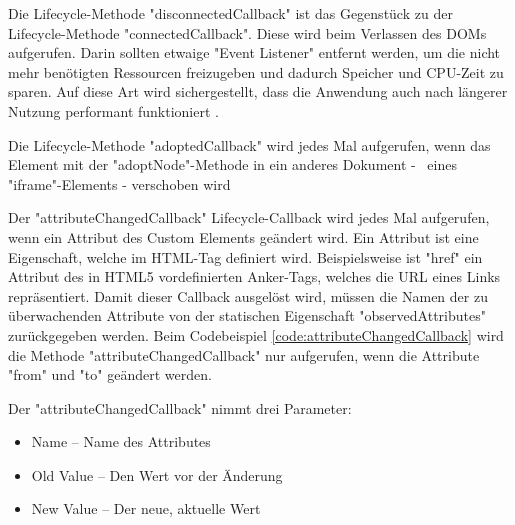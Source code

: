 
Die Lifecycle-Methode "{\ttfamily disconnectedCallback}" ist das Gegenstück zu der Lifecycle-Methode "{\ttfamily connectedCallback}".
Diese wird beim Verlassen des DOMs aufgerufen. Darin sollten etwaige "Event Listener" entfernt werden, um die nicht mehr benötigten Ressourcen freizugeben und dadurch Speicher und CPU-Zeit zu sparen. 
Auf diese Art wird sichergestellt, dass die Anwendung auch nach längerer Nutzung performant funktioniert \cite{MDNWebCustomElements}.


Die Lifecycle-Methode "{\ttfamily adoptedCallback}" wird jedes Mal aufgerufen, wenn das Element mit der "{\ttfamily adoptNode}"-Methode in ein anderes Dokument - \zb\ eines "{\ttfamily iframe}"-Elements - verschoben wird \cite{MDNWebCustomElements}


Der "{\ttfamily attributeChangedCallback}" Lifecycle-Callback wird jedes Mal aufgerufen, wenn ein Attribut des Custom Elements geändert wird. 
Ein Attribut ist eine Eigenschaft, welche im HTML-Tag definiert wird. 
Beispielsweise ist "{\ttfamily href}" ein Attribut des in HTML5 vordefinierten Anker-Tags, welches die URL eines Links repräsentiert. 
Damit dieser Callback ausgelöst wird, müssen die Namen der zu überwachenden Attribute von der statischen Eigenschaft "{\ttfamily observedAttributes}" zurückgegeben werden. \cite{MDNWebCustomElements} Beim Codebeispiel \ref{code:attributeChangedCallback} wird die Methode "{\ttfamily attributeChangedCallback}" nur aufgerufen, wenn die Attribute "from" und "to" geändert werden.
    
Der "{\ttfamily attributeChangedCallback}" nimmt drei Parameter\cite{MDNWebCustomElements}:
\begin{itemize}
    \item Name -- Name des Attributes
    \item Old Value -- Den Wert vor der Änderung
    \item New Value -- Der neue, aktuelle Wert 
\end{itemize}


